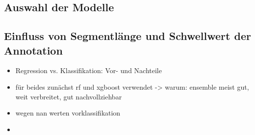 \subsection{Auswahl der Modelle}

\subsection{Einfluss von Segmentlänge und Schwellwert der Annotation}
\begin{itemize}
	\item Regression vs. Klassifikation: Vor- und Nachteile
	\item für beides zunächst rf und xgboost verwendet -> warum: ensemble meist gut, weit verbreitet, gut nachvollziehbar
	\item wegen nan werten vorklassifikation
	\item 
\end{itemize}





